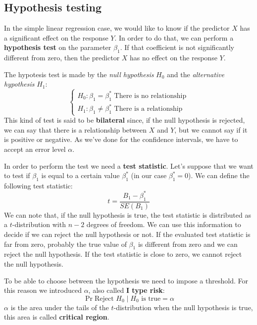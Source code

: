\subsection{Hypothesis testing}
In the simple linear regression case, we would like to know if the predictor $X$ has a significant effect on the response $Y$. In order to do that, we can perform a \textbf{hypothesis test} on the parameter $\beta_1$.
If that coefficient is not significantly different from zero, then the predictor $X$ has no effect on the response $Y$.

The hypotesis test is made by the \textit{null hypothesis} $H_0$ and the \textit{alternative hypothesis} $H_1$:
\[\begin{cases}
        H_0: \beta_1 = \beta^\ast_1 \text{ There is no relationship} \\
        H_1: \beta_1 \neq \beta^\ast_1 \text{ There is a relationship}
    \end{cases}\]
This kind of test is said to be \textbf{bilateral} since, if the null hypothesis is rejected, we can say that there is a relationship between $X$ and $Y$, but we cannot say if it is positive or negative.
As we've done for the confidence intervals, we have to accept an error level $\alpha$.

In order to perform the test we need a \textbf{test statistic}.
Let's suppose that we want to test if $\beta_1$ is equal to a certain value $\beta_1^\ast$ (in our case $\beta_1^\ast = 0$). We can define the following test statistic:
\[
    t = \frac{B_1 - \beta_1^\ast}{SE(B_1)}
\]
We can note that, if the null hypothesis is true, the test statistic is distributed as a $t$-distribution with $n-2$ degrees of freedom.
We can use this information to decide if we can reject the null hypothesis or not. If the evaluated test statistic is far from zero, probably the true value of $\beta_1$ is different from zero and we can reject the null hypothesis. If the test statistic is close to zero, we cannot reject the null hypothesis.

To be able to choose between the hypothesis we need to impose a threshold. For this reason we introduced $\alpha$, also called \textbf{I type risk}:
\[
    \Pr{\text{Reject } H_0 \mid H_0 \text{ is true}} = \alpha
\]
$\alpha$ is the area under the tails of the $t$-distribution when the null hypothesis is true, this area is called \textbf{critical region}.

